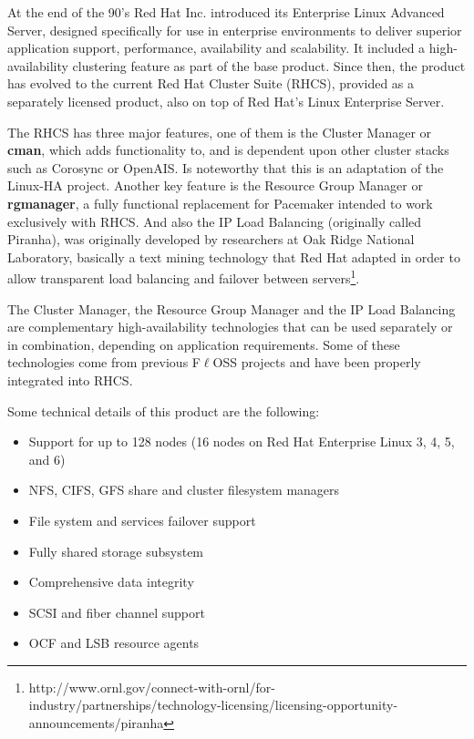 \documentclass[a4paper, 12pt]{book}
\begin{document}
At the end of the 90's Red Hat Inc. introduced its Enterprise Linux Advanced Server, designed specifically for use in enterprise environments to deliver superior application support, performance, availability and scalability. It included a high-availability clustering feature as part of the base product. Since then, the product has evolved to the current Red Hat Cluster Suite (RHCS), provided as a separately licensed product, also on top of Red Hat's Linux Enterprise Server.\bigskip

\noindent The RHCS has three major features, one of them is the Cluster Manager or \textbf{cman}, which adds functionality to, and is dependent upon other cluster stacks such as Corosync or OpenAIS. Is noteworthy that this is an adaptation of the Linux-HA project. Another key feature is the Resource Group Manager or \textbf{rgmanager}, a fully functional replacement for Pacemaker intended to work exclusively with RHCS. And also the IP Load Balancing (originally called Piranha), was originally developed by researchers at Oak Ridge National Laboratory, basically a text mining technology that Red Hat adapted in order to allow transparent load balancing and failover between servers\footnote{http://www.ornl.gov/connect-with-ornl/for-industry/partnerships/technology-licensing/licensing-opportunity-announcements/piranha}.\bigskip

\noindent The Cluster Manager, the Resource Group Manager and the IP Load Balancing are complementary high-availability technologies that can be used separately or in combination, depending on application requirements. Some of these technologies come from previous F$\ell$OSS projects and have been properly integrated into RHCS.\bigskip

\noindent Some technical details of this product are the following:

\begin{itemize}
	\item Support for up to 128 nodes (16 nodes on Red Hat Enterprise Linux 3, 4, 5, and 6)
	\item NFS, CIFS, GFS share and cluster filesystem managers
	\item File system and services failover support
	\item Fully shared storage subsystem
	\item Comprehensive data integrity
	\item SCSI and fiber channel support
	\item OCF and LSB resource agents
\end{itemize}
\end{document}
